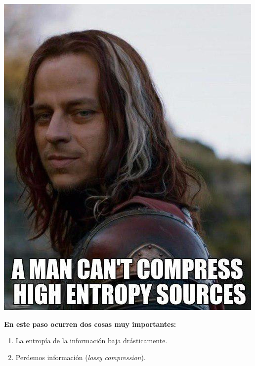 \documentclass{beamer}
\begin{document}
\begin{frame}
    \centering \includegraphics[scale=0.35]{fig/jaquen_meme.jpg}\\
\end{frame}

\begin{frame}
    \textbf{En este paso ocurren dos cosas muy importantes:}
    \begin{enumerate}
        \item La entropía de la información baja drásticamente.
        \item Perdemos información (\textit{lossy compression}).
    \end{enumerate}
\end{frame}
\end{document}
